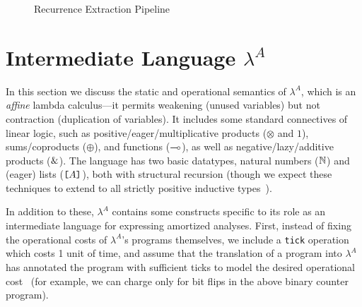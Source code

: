 

\begin{figure}[t]
  \caption{Recurrence Extraction Pipeline}
  \label{fig:pipeline}
\end{figure}


\section{Intermediate Language \texorpdfstring{$\lambda^A$}{}}\label{sec:la}

In this section we discuss the static and operational semantics of
$\lambda^A$, which is an \emph{affine} lambda calculus---it permits
weakening (unused variables) but not contraction (duplication of
variables).  It includes some standard connectives of linear logic, such
as positive/eager/multiplicative products ($\otimes$ and $1$),
sums/coproducts ($\oplus$), and functions ($\multimap$), as well as
negative/lazy/additive products ($\&$).  The language has two basic
datatypes, natural numbers ($\mathbb{N}$) and (eager) lists ($\texttt{[}A\texttt{]}$), both
with structural recursion (though we expect these techniques to extend
to all strictly positive inductive
types~\cite{danner-et-al:icfp15,danner-licata:jfp-in-prep}).

In addition to these, $\lambda^A$ contains some constructs specific to
its role as an intermediate language for expressing amortized analyses.
First, instead of fixing the operational costs of $\lambda^A$'s programs
themselves, we include a \texttt{tick} operation which costs 1 unit of
time, and assume that the translation of a program into $\lambda^A$ has
annotated the program with sufficient ticks to model the desired
operational cost~\cite{danielsson:popl08} (for example, we can
charge only for bit flips in the above binary counter
program).

